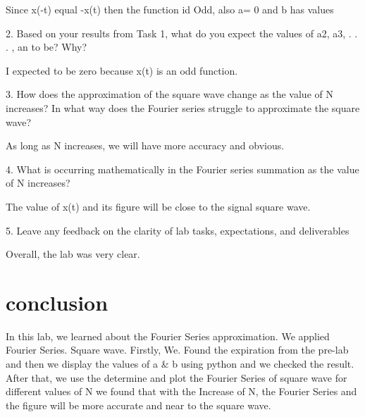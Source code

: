 \documentclass[12pt]{report}
\begin{document}
	Since x(-t) equal -x(t) then the function id Odd, also a= 0 and b has values

2. Based on your results from Task 1, what do you expect the values of a2, a3, . . . , an to be?
Why?

I expected to be zero because x(t) is an odd function.

3. How does the approximation of the square wave change as the value of N increases? In what
way does the Fourier series struggle to approximate the square wave?

As long as N increases, we will have more accuracy and obvious.

4. What is occurring mathematically in the Fourier series summation as the value of N increases?

The value of x(t) and its figure will be close to the signal square wave.


5. Leave any feedback on the clarity of lab tasks, expectations, and deliverables

Overall, the lab was very clear.






\section{conclusion}
In this lab, we learned about the Fourier Series approximation. We applied Fourier Series. Square wave. Firstly, We. Found the expiration from the  pre-lab and then we display the values of a & b using python and we checked the result. After that, we use the determine and plot the Fourier Series of square wave for different values of  N we found that with the Increase of N, the Fourier Series and the figure will be more accurate and near to the square wave. 


\newpage
\end{document}
